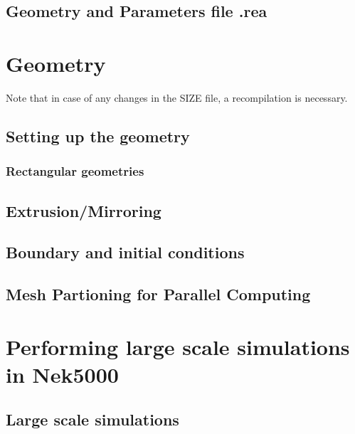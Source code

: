 \documentclass[11pt]{report}              %
\begin{document}
\section{Geometry and Parameters file .rea}





\chapter{Geometry}\label{sec:geom}

Note that in case of any changes in the SIZE file, a recompilation is necessary.\\
\section{Setting up the geometry}
\subsection{Rectangular geometries}
\label{sec:genbox}
%
\section{Extrusion/Mirroring}


\section{Boundary and initial conditions}



\section{Mesh Partioning for Parallel Computing}


\chapter{Performing large scale simulations  in Nek5000}
\section{Large scale simulations}

\end{document}
